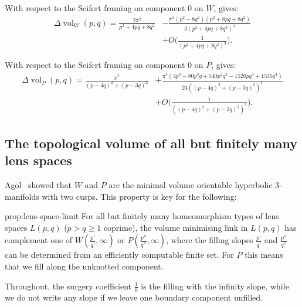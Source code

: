 \documentclass[a4paper]{gtart}
\theoremstyle{definition}
\theoremstyle{remark}
\numberwithin{equation}{section}
\DeclareMathOperator{\vol}{vol}
\begin{document}
With respect to the Seifert framing on component $0$ on $W$, 
\cite[(5.14)]{Hodgson_Masai} gives:
\begin{align}
\Delta \vol_W (p,q) = 
\frac{2 \pi^2}{p^2 + 4 p q + 8 q^2}
& - \frac{\pi^4 (p^2 - 8 q^2) (p^2 + 8 p q + 8 q^2)}{3 (p^2 + 4 p q + 8 q^2)^4}\nonumber \\
&+O\Bigg( \frac{1}{(p^2 + 4 p q + 8 q^2)^3}\Bigg).\label{eq:DvolW}
\end{align}

With respect to the Seifert framing on component $0$ on $P$, \cite[(5.11)]{Hodgson_Masai} gives:
\begin{align}
\Delta \vol_P (p,q) = 
\frac{\pi^2}{(p - 4 q)^2 + (p - 3 q)^2}
&+
\frac{\pi^4 (4 p^4 - 80 p^3 q + 540 p^2 q^2 - 1520 p q^3 + 1535 q^4)}{24 ((p - 4 q)^2 + (p - 3 q)^2)^4}\nonumber \\
&+ 
O\Bigg( \frac{1}{((p - 4 q)^2 + (p - 3 q)^2)^3}\Bigg).\label{eq:DvolP}
\end{align}

\subsection{The topological volume of all but finitely many lens spaces}

Agol~\cite{agol-2cusped} showed that $W$ and $P$ are the minimal volume orientable hyperbolic 3-manifolds with two cusps. This property is key for the following:

\begin{reptheorem}{prop:lens-space-limit}
For all but finitely many homeomorphism types of lens spaces $L(p,q)$ ($p>q\geq 1$ coprime), the volume minimising link in $L(p,q)$ has complement one of $W(\frac{p'}{q'}, \infty)$ or $P(\frac{p''}{q''}, \infty)$, where the filling slopes $\frac{p'}{q'}$ and $\frac{p''}{q''}$ can be determined from an efficiently computable finite set. For $P$ this means that we fill along the unknotted component.
\end{reptheorem}

Throughout, the surgery coefficient $\frac{1}{0}$ is the filling with the infinity slope, while we do not write any slope if we leave one boundary component unfilled.
\end{document}
